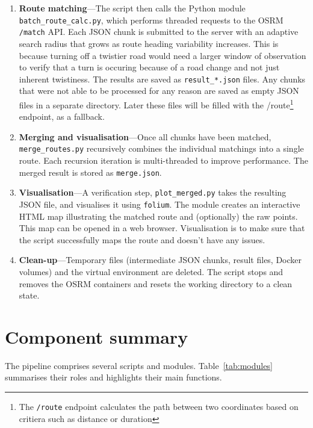 \documentclass[12pt,a4paper]{article}
\begin{document}
\begin{enumerate}
	\item \textbf{Route matching}---The script then calls the Python module
	      \texttt{batch\_route\_calc.py}, which performs threaded requests to the
	      OSRM \texttt{/match} API.  Each JSON chunk is submitted to the server
	      with an adaptive search radius that grows as route heading variability increases. This is because
	      turning off a twistier road would need a larger window of observation to verify that a turn
	      is occuring because of a road change and not just inherent twistiness. The results are saved as \texttt{result\_*.json} files.
	      Any chunks that were not able to be processed for any reason are saved as empty JSON files in a separate directory. Later
	      these files will be filled with the /route\footnote{The \texttt{/route} endpoint calculates the path between two coordinates
		      based on critiera such as distance or duration} endpoint, as a fallback.
	\item \textbf{Merging and visualisation}---Once all chunks have been matched,
	      \texttt{merge\_routes.py} recursively combines the individual
	      matchings into a single route. Each recursion iteration is multi-threaded to improve performance.  The merged result is stored as
	      \texttt{merge.json}.
	\item \textbf{Visualisation}---A verification step, \texttt{plot\_merged.py} takes the resulting JSON file, and visualises it using \texttt{folium}.
	      The module creates an interactive HTML map illustrating the matched route and
	      (optionally) the raw points.  This map can be opened in a web browser. Visualisation is to make sure that the script successfully maps
	      the route and doesn't have any issues.
	\item \textbf{Clean-up}---Temporary files (intermediate JSON chunks, result
	      files, Docker volumes) and the virtual environment are deleted.  The
	      script stops and removes the OSRM containers and resets the working
	      directory to a clean state.
\end{enumerate}

\section{Component summary}
The pipeline comprises several scripts and modules.  Table~\ref{tab:modules}
summarises their roles and highlights their main functions.
\end{document}

